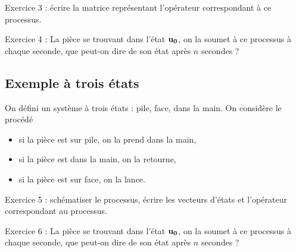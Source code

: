 \so Exercice 3 : écrire la matrice représentant l'opérateur correspondant à ce processus.

\so Exercice 4 : La pièce se trouvant dans l'état $\bf u_0$, on la soumet à ce processus à chaque seconde, que peut-on dire de son état après $n$ secondes ?

\subsection{Exemple à trois états}
On défini un système à trois états : pile, face, dans la main. On considère le procédé
\begin{itemize}[leftmargin=1cm, label=, itemsep=1pt]
\item si la pièce est sur pile, on la prend dans la main,
\item si la pièce est dans la main, on la retourne,
\item si la pièce est sur face, on la lance.
\end{itemize}

\so Exercice 5 : schématiser le processus, écrire les vecteurs d'états et l'opérateur correspondant au processus.

\so Exercice 6 : La pièce se trouvant dans l'état $\bf u_0$, on la soumet à ce processus à chaque seconde, que peut-on dire de son état après $n$ secondes ?
